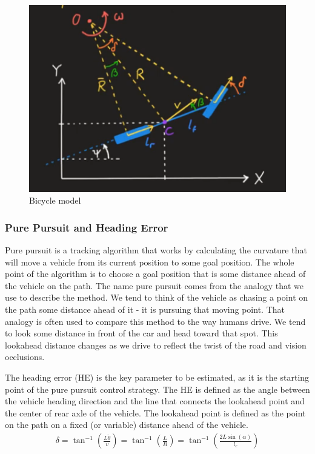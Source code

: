 \documentclass[a4paper,12pt,sort&compress]{article}
\begin{document}
    \begin{figure}
        \centering
        \includegraphics[width=0.8\linewidth]{bicycle_model.png}
        \caption{Bicycle model}
        \label{fig:bicycle_model}
    \end{figure}

    \subsubsection*{Pure Pursuit and Heading Error}
    Pure pursuit is a tracking algorithm that works by calculating the curvature that will move a vehicle
    from its current position to some goal position. The whole point of the algorithm is to choose a goal
    position that is some distance ahead of the vehicle on the path. The name pure pursuit comes from
    the analogy that we use to describe the method. We tend to think of the vehicle as chasing a point
    on the path some distance ahead of it - it is pursuing that moving point. That analogy is often used
    to compare this method to the way humans drive. We tend to look some distance in front of the car
    and head toward that spot. This lookahead distance changes as we drive to reflect the twist of the
    road and vision occlusions\cite{coulter1992implementation}.

    The heading error (HE) is the key parameter to be estimated, as it is the
    starting point of the pure pursuit control strategy\citep{7796574,9368694}.
    The HE is defined as the angle between the vehicle heading direction and the
    line that connects the lookahead point and the center of rear axle of the
    vehicle. The lookahead point is defined as the point on the path on a fixed (or
    variable) distance ahead of the vehicle. 
    \begin{align}
        \delta=\tan^{-1}\left(\frac{L\dot{\theta}}{v}\right)=\tan^{-1}\left(\frac{L}{R}\right)=\tan^{-1}\left(\frac{2L\sin\left(\alpha\right)}{l_{c}}\right)
    \end{align}
\end{document}

